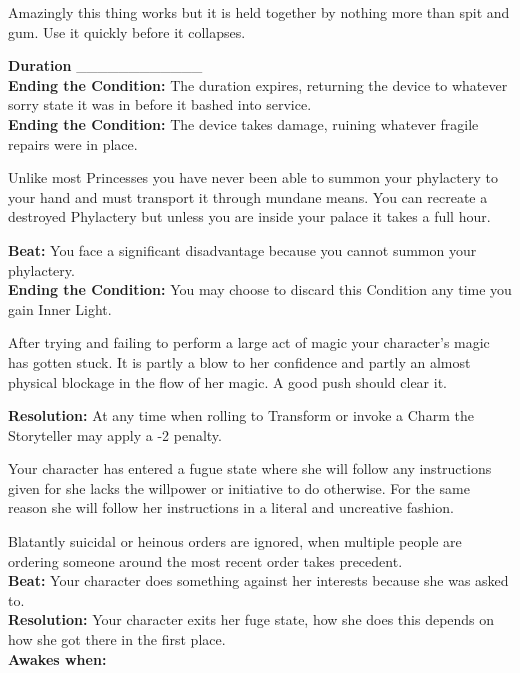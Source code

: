 \documentclass[10pt, frontgrid, backgrid]{flacards}
\begin{document}
{Amazingly this thing works but it is held together by nothing more than spit and gum. Use it quickly before it collapses. 

\textbf{Duration} \_\_\_\_\_\_\_\_\_\_\_\_ \\
\textbf{Ending the Condition:} The duration expires, returning the device to whatever sorry state it was in before it bashed into service.\\
\textbf{Ending the Condition:} The device takes damage, ruining whatever fragile repairs were in place.}

{Unlike most Princesses you have never been able to summon your phylactery to your hand and must transport it through mundane means. You can recreate a destroyed Phylactery but unless you are inside your palace it takes a full hour.

\textbf{Beat:} You face a significant disadvantage because you cannot summon your phylactery. \\
\textbf{Ending the Condition:} You may choose to discard this Condition any time you gain Inner Light.}

{After trying and failing to perform a large act of magic your character's magic has gotten stuck. It is partly a blow to her confidence and partly an almost physical blockage in the flow of her magic. A good push should clear it. 

\textbf{Resolution:} At any time when rolling to Transform or invoke a Charm the Storyteller may apply a -2 penalty.}

{Your character has entered a fugue state where she will follow any instructions given for she lacks the willpower or initiative to do otherwise. For the same reason she will follow her instructions in a literal and uncreative fashion.

Blatantly suicidal or heinous orders are ignored, when multiple people are ordering someone around the most recent order takes precedent.\\
\textbf{Beat:} Your character does something against her interests because she was asked to. \\
\textbf{Resolution:} Your character exits her fuge state, how she does this depends on how she got there in the first place. \\
\textbf{Awakes when:} \fillunderline }
\end{document}
